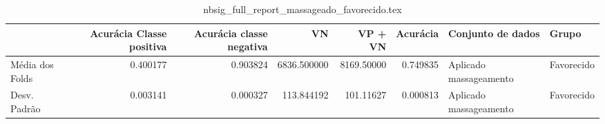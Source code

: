 \begin{table}
\centering
\caption{nbsig_full_report_massageado_favorecido.tex}
\label{nbsig_full_report_massageado_favorecido.tex}
\begin{tabular}{lrrrrrll}
\toprule
{}              &  Acurácia Classe positiva &  Acurácia classe negativa &          VN  &    VP + VN  &  Acurácia &       Conjunto de dados &       Grupo \\
\midrule
Média dos Folds &                  0.400177 &                  0.903824 &  6836.500000 &  8169.50000 &  0.749835 &  Aplicado massageamento &  Favorecido \\
Desv. Padrão    &                  0.003141 &                  0.000327 &   113.844192 &   101.11627 &  0.000813 &  Aplicado massageamento &  Favorecido \\
\bottomrule
\end{tabular}
\end{table}
